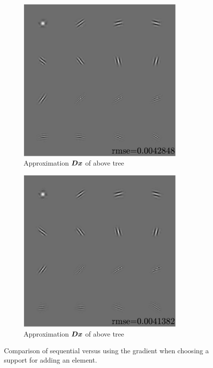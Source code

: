 \begin{figure}[!h] \ContinuedFloat
\begin{subfigure}[b]{0.49\textwidth}\centering
\includegraphics[width=0.9\textwidth]{figures/tree-learn/gradient-vs-sequential/xp_learnsupp256_curvelet_decomp3_tree-binary_dpth4_supp-diracs_usegrad1_every5_add5_totinit0_totadd279_alpha30_approx.pdf}
	\caption{Approximation $\bm{D}\bm{x}$ of above tree}\label{fig_cmp_grad_approx}
\end{subfigure}
\begin{subfigure}[b]{0.49\textwidth}\centering
\includegraphics[width=0.9\textwidth]{figures/tree-learn/gradient-vs-sequential/xp_learnsupp256_curvelet_decomp3_tree-binary_dpth4_supp-diracs_usegrad0_every5_add5_totinit0_totadd279_alpha30_approx.pdf} 
	\caption{Approximation $\bm{D}\bm{x}$ of above tree}\label{fig_cmp_seq_approx}
\end{subfigure}
\caption{Comparison of sequential versus using the gradient when choosing a support for adding an element.}\label{fig_cmp_seq_vs_grad}
\end{figure}

